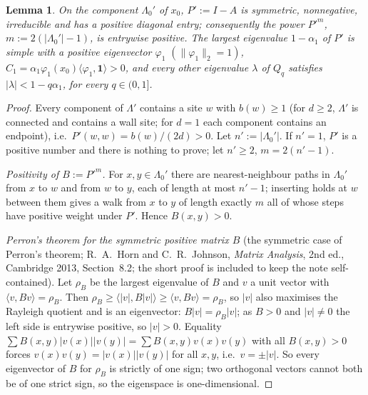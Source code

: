 \documentclass[11pt,a4paper]{article}
\newtheorem{lemma}[theorem]{Lemma}
\theoremstyle{definition}
\newcommand{\one}{\mathbf 1}
\begin{document}
\begin{lemma}\label{lem:perron}
On the component $\Lambda_0'$ of $x_0$, $P':=I-A$ is symmetric, nonnegative, irreducible and has a positive diagonal entry; consequently the power $P'^m$, $m:=2(|\Lambda_0'|-1)$, is entrywise positive. The largest eigenvalue $1-\alpha_1$ of $P'$ is simple with a positive eigenvector $\varphi_1$ $(\|\varphi_1\|_2=1)$, $C_1=\alpha_1\varphi_1(x_0)\langle\varphi_1,\one\rangle>0$, and every other eigenvalue $\lambda$ of $Q_q$ satisfies $|\lambda|<1-q\alpha_1$, for every $q\in(0,1]$.
\end{lemma}
\begin{proof}
Every component of $\Lambda'$ contains a site $w$ with $b(w)\ge1$ (for $d\ge2$, $\Lambda'$ is connected and contains a wall site; for $d=1$ each component contains an endpoint), i.e.\ $P'(w,w)=b(w)/(2d)>0$. Let $n':=|\Lambda_0'|$. If $n'=1$, $P'$ is a positive number and there is nothing to prove; let $n'\ge2$, $m=2(n'-1)$.

\emph{Positivity of $B:=P'^m$.} For $x,y\in\Lambda_0'$ there are nearest-neighbour paths in $\Lambda_0'$ from $x$ to $w$ and from $w$ to $y$, each of length at most $n'-1$; inserting holds at $w$ between them gives a walk from $x$ to $y$ of length exactly $m$ all of whose steps have positive weight under $P'$. Hence $B(x,y)>0$.

\emph{Perron's theorem for the symmetric positive matrix $B$} (the symmetric case of Perron's theorem; R.~A.~Horn and C.~R.~Johnson, \emph{Matrix Analysis}, 2nd ed., Cambridge 2013, Section~8.2; the short proof is included to keep the note self-contained). Let $\rho_B$ be the largest eigenvalue of $B$ and $v$ a unit vector with $\langle v,Bv\rangle=\rho_B$. Then $\rho_B\ge\langle|v|,B|v|\rangle\ge\langle v,Bv\rangle=\rho_B$, so $|v|$ also maximises the Rayleigh quotient and is an eigenvector: $B|v|=\rho_B|v|$; as $B>0$ and $|v|\ne0$ the left side is entrywise positive, so $|v|>0$. Equality $\sum B(x,y)|v(x)||v(y)|=\sum B(x,y)v(x)v(y)$ with all $B(x,y)>0$ forces $v(x)v(y)=|v(x)||v(y)|$ for all $x,y$, i.e.\ $v=\pm|v|$. So every eigenvector of $B$ for $\rho_B$ is strictly of one sign; two orthogonal vectors cannot both be of one strict sign, so the eigenspace is one-dimensional.


\end{proof}
\end{document}
